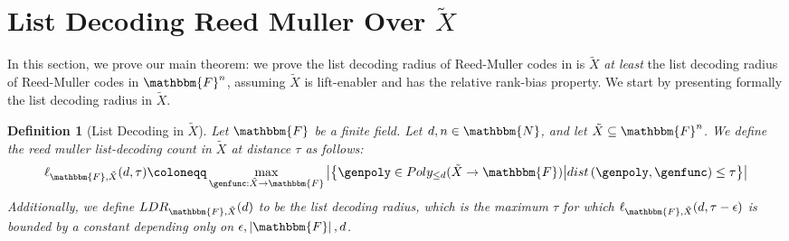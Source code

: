 \documentclass[10pt,a4paper]{article}
\newtheorem{definition}[theorem]{Definition}
\newcommand{\definedas}[0]{\coloneqq}
\newcommand{\parens}[1]{\left( #1 \right)}
\newcommand{\set}[1]{\left\{ #1 \right\}}
\newcommand{\suchthat}[0]{\middle|}
\newcommand{\basefield}[0]{\mathbbm{F}}
\newcommand{\blocklength}[0]{n}
\newcommand{\field}[0]{\basefield^{\blocklength}}
\newcommand{\degree}[0]{d}
\newcommand{\funcdef}[3]{#1:#2\rightarrow#3}
\newcommand{\allpolyset}[3]{Poly_{#1}(#2\rightarrow#3)}
\newcommand{\naturalnumbersset}[0]{\mathbbm{N}}
\newcommand{\variety}{{\tilde{X}}}
\newcommand{\titlevariety}{\texorpdfstring{$\variety$}{X}}
\newcommand{\abs}[1]{\left| #1 \right|}
\newcommand{\dist}[1]{dist \parens{#1}}
\newcommand{\listpolycount}[4]{\ell_{#1, #2}(#3, #4)}
\newcommand{\listdecodingradiusex}[3]{LDR_{#1, #2}(#3)}
\begin{document}
\section[List Decoding Reed Muller Over \titlevariety]{List Decoding Reed Muller Over \titlevariety}\label{sec:list-decoding-reed-muller-over-X}
In this section, we prove our main theorem:
we prove the list decoding radius of Reed-Muller codes in is $\variety$ \emph{at least}
the list decoding radius of Reed-Muller codes in $\field$,
assuming $\variety$ is lift-enabler and has the relative rank-bias property.
We start by presenting formally the list decoding radius in $\variety$.
\begin{definition}[List Decoding in $\variety$]
    Let $\basefield$ be a finite field.
    Let $\degree, \blocklength \in \naturalnumbersset$, and let $\variety \subseteq \field$.
    \newline
    We define the reed muller list-decoding count in $\variety$ at distance $\tau$ as follows:
    \[
        \listpolycount{\basefield}{\variety}{\degree}{\tau} \definedas
        \max_{\funcdef{\genfunc}{\variety}{\basefield}}
            {\abs{\set{\genpoly \in \allpolyset{\leq \degree}{\variety}{\basefield} \suchthat {\dist{\genpoly, \genfunc} \leq \tau}}}}
    \]
    Additionally, we define $\listdecodingradiusex{\basefield}{\variety}{\degree}$ to be the \emph{list decoding radius}, which is
    the maximum $\tau$ for which $\listpolycount{\basefield}{\variety}{\degree}{\tau - \epsilon}$ is bounded by a \emph{constant} depending only on $\epsilon, \abs{\basefield}, \degree$.
\end{definition}
\end{document}
